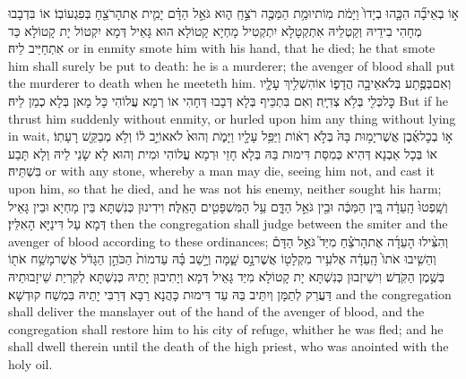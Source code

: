 {א֣וֹ בְאֵיבָ֞ה הִכָּ֤הוּ בְיָדוֹ֙ וַיָּמֹ֔ת מֽוֹת\maqqaf יוּמַ֥ת הַמַּכֶּ֖ה רֹצֵ֣חַֽ ה֑וּא גֹּאֵ֣ל הַדָּ֗ם יָמִ֛ית אֶת\maqqaf הָרֹצֵ֖חַ בְּפִגְעוֹ\maqqaf בֽוֹ׃}
{אוֹ בִּדְבָבוּ מְחָהִי בִידֵיהּ וְקַטְלֵיהּ אִתְקְטָלָא יִתְקְטִיל מָחְיָא קָטוֹלָא הוּא גָּאֵיל דְּמָא יִקְטוֹל יָת קָטוֹלָא כַּד אִתְחַיַּיב לֵיהּ׃}
{or in enmity smote him with his hand, that he died; he that smote him shall surely be put to death: he is a murderer; the avenger of blood shall put the murderer to death when he meeteth him.}{}
{וְאִם\maqqaf בְּפֶ֥תַע בְּלֹא\maqqaf אֵיבָ֖ה הֲדָפ֑וֹ אוֹ\maqqaf הִשְׁלִ֥יךְ עָלָ֛יו כׇּל\maqqaf כְּלִ֖י בְּלֹ֥א צְדִיָּֽה׃}
{וְאִם בִּתְכֵּיף בְּלָא דְּבָבוּ דְּחָהִי אוֹ רְמָא עֲלוֹהִי כָּל מָאן בְּלָא כְמַן לֵיהּ׃}
{But if he thrust him suddenly without enmity, or hurled upon him any thing without lying in wait,}{}
{א֣וֹ בְכׇל\maqqaf אֶ֜בֶן אֲשֶׁר\maqqaf יָמ֥וּת בָּהּ֙ בְּלֹ֣א רְא֔וֹת וַיַּפֵּ֥ל עָלָ֖יו וַיָּמֹ֑ת וְהוּא֙ לֹא\maqqaf אוֹיֵ֣ב ל֔וֹ וְלֹ֥א מְבַקֵּ֖שׁ רָעָתֽוֹ׃}
{אוֹ בְּכָל אַבְנָא דְּהִיא כְּמִסַּת דִּימוּת בַּהּ בְּלָא חָזֵי וּרְמָא עֲלוֹהִי וּמִית וְהוּא לָא שָׂנֵי לֵיהּ וְלָא תָּבַע בִּשְׁתֵּיהּ׃}
{or with any stone, whereby a man may die, seeing him not, and cast it upon him, so that he died, and he was not his enemy, neither sought his harm;}{}
{וְשָֽׁפְטוּ֙ הָֽעֵדָ֔ה בֵּ֚ין הַמַּכֶּ֔ה וּבֵ֖ין גֹּאֵ֣ל הַדָּ֑ם עַ֥ל הַמִּשְׁפָּטִ֖ים הָאֵֽלֶּה׃}
{וִידִינוּן כְּנִשְׁתָּא בֵּין מָחְיָא וּבֵין גָּאֵיל דְּמָא עַל דִּינַיָּא הָאִלֵּין׃}
{then the congregation shall judge between the smiter and the avenger of blood according to these ordinances;}{}
{וְהִצִּ֨ילוּ הָעֵדָ֜ה אֶת\maqqaf הָרֹצֵ֗חַ מִיַּד֮ גֹּאֵ֣ל הַדָּם֒ וְהֵשִׁ֤יבוּ אֹתוֹ֙ הָֽעֵדָ֔ה אֶל\maqqaf עִ֥יר מִקְלָט֖וֹ אֲשֶׁר\maqqaf נָ֣ס שָׁ֑מָּה וְיָ֣שַׁב בָּ֗הּ עַד\maqqaf מוֹת֙ הַכֹּהֵ֣ן הַגָּדֹ֔ל אֲשֶׁר\maqqaf מָשַׁ֥ח אֹת֖וֹ בְּשֶׁ֥מֶן הַקֹּֽדֶשׁ׃}
{וִישֵׁיזְבוּן כְּנִשְׁתָּא יָת קָטוֹלָא מִיַּד גָּאֵיל דְּמָא וְיָתִיבוּן יָתֵיהּ כְּנִשְׁתָּא לְקִרְיַת שֵׁיזָבוּתֵיהּ דַּעֲרַק לְתַמָּן וְיִתֵּיב בַּהּ עַד דִּימוּת כָּהֲנָא רַבָּא דְּרַבִּי יָתֵיהּ בִּמְשַׁח קוּדְשָׁא׃}
{and the congregation shall deliver the manslayer out of the hand of the avenger of blood, and the congregation shall restore him to his city of refuge, whither he was fled; and he shall dwell therein until the death of the high priest, who was anointed with the holy oil.}{}
